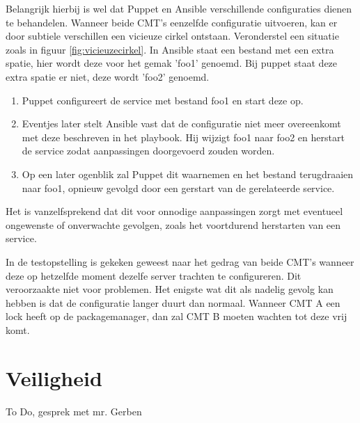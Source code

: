  Belangrijk hierbij is wel dat Puppet en Ansible verschillende configuraties dienen te behandelen. Wanneer beide \gls{CMT}'s eenzelfde configuratie uitvoeren, kan er door subtiele verschillen een vicieuze cirkel ontstaan.
Veronderstel een situatie zoals in figuur \ref{fig:vicieuzecirkel}. In Ansible staat een bestand met een extra spatie, hier wordt deze voor het gemak 'foo1' genoemd. Bij puppet staat deze extra spatie er niet, deze wordt 'foo2' genoemd. 
\begin{enumerate}
\item Puppet configureert de service met bestand foo1 en start deze op.
\item  Eventjes later stelt Ansible vast dat de configuratie niet meer overeenkomt met deze beschreven in het playbook. Hij wijzigt foo1 naar foo2 en herstart de service zodat aanpassingen doorgevoerd zouden worden.
\item  Op een later ogenblik zal Puppet dit waarnemen en het bestand terugdraaien naar foo1, opnieuw gevolgd door een gerstart van de gerelateerde service.
\end{enumerate}
Het is vanzelfsprekend dat dit voor onnodige aanpassingen zorgt met eventueel ongewenste of onverwachte gevolgen, zoals het voortdurend herstarten van een service.

In de testopstelling is gekeken geweest naar het gedrag van beide \gls{CMT}'s wanneer deze op hetzelfde moment dezelfe server trachten te configureren. Dit veroorzaakte niet voor problemen.
Het enigste wat dit als nadelig gevolg kan hebben is dat de configuratie langer duurt dan normaal. Wanneer \gls{CMT} A een lock heeft op de \gls{packagemanager}, dan zal \gls{CMT} B moeten wachten tot deze vrij komt. 



\section{Veiligheid}

To Do, gesprek met mr. Gerben